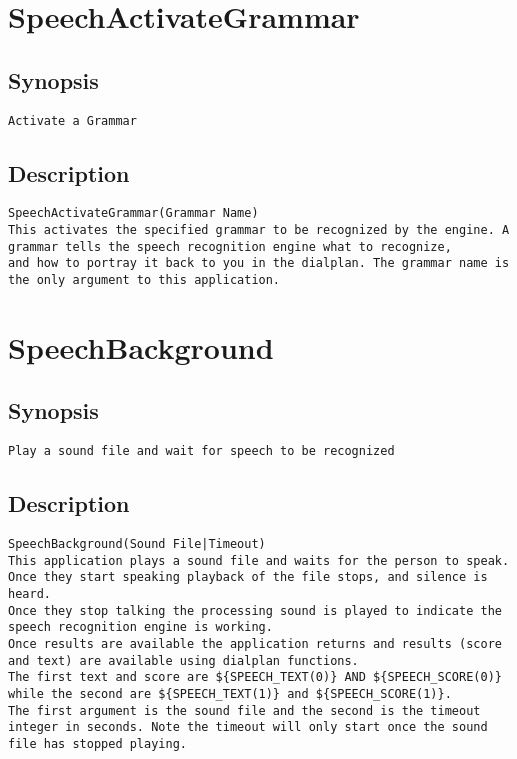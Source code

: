 \section{SpeechActivateGrammar}
\subsection{Synopsis}
\begin{verbatim}
Activate a Grammar
\end{verbatim}
\subsection{Description}
\begin{verbatim}
SpeechActivateGrammar(Grammar Name)
This activates the specified grammar to be recognized by the engine. A grammar tells the speech recognition engine what to recognize, 
and how to portray it back to you in the dialplan. The grammar name is the only argument to this application.

\end{verbatim}


\section{SpeechBackground}
\subsection{Synopsis}
\begin{verbatim}
Play a sound file and wait for speech to be recognized
\end{verbatim}
\subsection{Description}
\begin{verbatim}
SpeechBackground(Sound File|Timeout)
This application plays a sound file and waits for the person to speak. Once they start speaking playback of the file stops, and silence is heard.
Once they stop talking the processing sound is played to indicate the speech recognition engine is working.
Once results are available the application returns and results (score and text) are available using dialplan functions.
The first text and score are ${SPEECH_TEXT(0)} AND ${SPEECH_SCORE(0)} while the second are ${SPEECH_TEXT(1)} and ${SPEECH_SCORE(1)}.
The first argument is the sound file and the second is the timeout integer in seconds. Note the timeout will only start once the sound file has stopped playing.

\end{verbatim}



